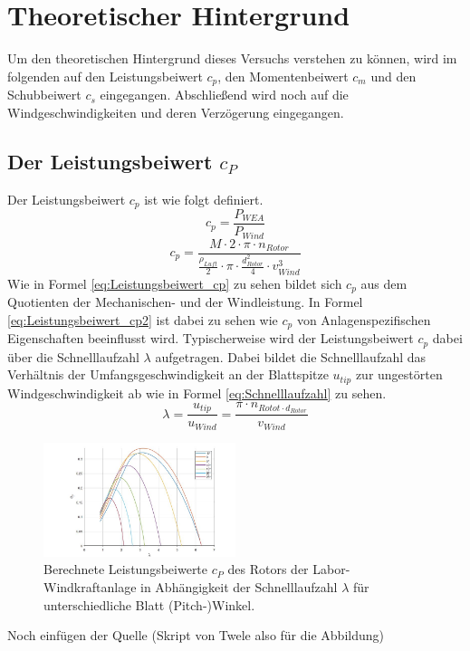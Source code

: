 \section{Theoretischer Hintergrund}
Um den theoretischen Hintergrund dieses Versuchs verstehen zu können, wird im folgenden auf den Leistungsbeiwert $c_{p}$, den Momentenbeiwert $c_{m}$ und den Schubbeiwert $c_{s}$ eingegangen. Abschließend wird noch auf die Windgeschwindigkeiten und deren Verzögerung eingegangen.
\subsection{Der Leistungsbeiwert \texorpdfstring{$c_P$}{}}
Der Leistungsbeiwert $c_{p}$ ist wie folgt definiert.
\begin{equation}
  c_{p}= \frac{P_{WEA}}{P_{Wind}}
    \label{eq:Leistungsbeiwert_cp}
\end{equation}
\begin{equation}
  c_{p}= \frac{M \cdot 2 \cdot \pi \cdot n_{Rotor}}{\frac{\rho_{Luft}}{2}\cdot \pi \cdot \frac{d^2_{Rotor}}{4} \cdot v^3_{Wind} }
    \label{eq:Leistungsbeiwert_cp2}
\end{equation}
Wie in Formel \ref{eq:Leistungsbeiwert_cp} zu sehen bildet sich $c_{p}$ aus dem Quotienten der Mechanischen- und der Windleistung. 
In Formel \ref{eq:Leistungsbeiwert_cp2} ist dabei zu sehen wie $c_{p}$ von Anlagenspezifischen Eigenschaften beeinflusst wird.
Typischerweise wird der Leistungsbeiwert $c_{p}$ dabei über die Schnelllaufzahl $\lambda$ aufgetragen. Dabei bildet die Schnelllaufzahl das Verhältnis der Umfangsgeschwindigkeit an der Blattspitze $u_{tip}$ zur ungestörten Windgeschwindigkeit ab wie in Formel \ref{eq:Schnelllaufzahl} zu sehen.
\begin{equation}
\lambda=\frac{u_{tip}}{u_{Wind}}=\frac{\pi \cdot n_{Rotot \cdot d_{Rotor}}}{v_{Wind}}
    \label{eq:Schnelllaufzahl}
\end{equation}

\begin{figure}[h!]
    \centering
    \includegraphics[width=0.5\textwidth]{Abbildungen/cpzulambda.jpg}
    \caption{Berechnete Leistungsbeiwerte $c_{P}$ des Rotors der Labor-Windkraftanlage in Abhängigkeit der Schnelllaufzahl $\lambda$ für unterschiedliche Blatt (Pitch-)Winkel.}
    \label{fig:cpzulambda}
\end{figure}
Noch einfügen der Quelle (Skript von Twele also für die Abbildung)

